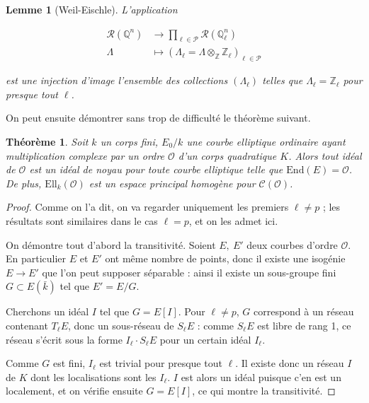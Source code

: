 \documentclass[11pt,a4paper]{article}
\newcommand{\Z}{\mathbb{Z}}
\newcommand{\Q}{\mathbb{Q}}
\renewcommand{\O}{\mathcal{O}}
\newcommand{\Cl}{\mathcal{C}}
\newcommand{\vers}{\longrightarrow}
\newcommand{\End}{\mathrm{End}}
\newcommand{\Ell}{\mathrm{Ell}}
\newtheorem*{thm}{Théorème}
\newtheorem*{lem}{Lemme}
\theoremstyle{definition}
\begin{document}
\begin{lem}[Weil-Eischle] L'application

$$\begin{aligned}
\mathcal{R}(\Q^n) &\longrightarrow \prod_{\ell\in \mathcal{P}} \mathcal{R}(\Q_\ell^n) \\
\Lambda\ \ &\longmapsto (\Lambda_\ell = \Lambda\otimes_\Z \Z_\ell)_{\ell\in\mathcal{P}}
\end{aligned}$$

est une injection d'image l'ensemble des collections $(\Lambda_\ell)$ telles que $\Lambda_\ell = \Z_\ell$ pour presque tout $\ell$.
\end{lem}

On peut ensuite démontrer sans trop de difficulté le théorème suivant.

\begin{thm}

Soit $k$ un corps fini, $E_0/k$ une courbe elliptique ordinaire ayant multiplication complexe par un ordre $\O$ d'un corps quadratique $K$. Alors tout idéal de $\O$ est un idéal de noyau pour toute courbe elliptique telle que $\End(E)=\O$. De plus, $\Ell_k(\O)$ est un espace principal homogène pour $\Cl(\O)$.

\end{thm}


\begin{proof}

Comme on l'a dit, on va regarder uniquement les premiers $\ell\neq p$ ; les résultats sont similaires dans le cas $\ell = p$, et on les admet ici.

On démontre tout d'abord la transitivité. Soient $E,\ E'$ deux courbes d'ordre $\O$. En particulier $E$ et $E'$ ont même nombre de points, donc il existe une isogénie $E \vers E'$ que l'on peut supposer séparable : ainsi il existe un sous-groupe fini $G\subset E(\bar{k})$ tel que $E' = E/G$.

Cherchons un idéal $I$ tel que $G = E[I]$. Pour $\ell\neq p$, $G$ correspond à un réseau contenant $T_\ell E$, donc un sous-réseau de $S_\ell E$ : comme $S_\ell E$ est libre de rang 1, ce réseau s'écrit sous la forme $I_\ell \cdot S_\ell E$ pour un certain idéal $I_\ell$.

Comme $G$ est fini, $I_\ell$ est trivial pour presque tout $\ell$. Il existe donc un réseau $I$ de $K$ dont les localisations sont les $I_\ell$. $I$ est alors un idéal puisque c'en est un localement, et on vérifie ensuite $G = E[I]$, ce qui montre la transitivité.

\end{proof}
\end{document}
